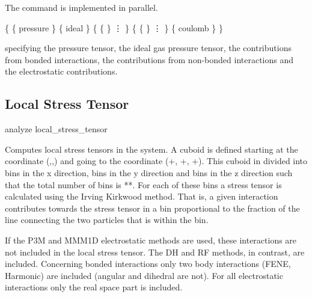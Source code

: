 The command is implemented in parallel.


\begin{code}
\{ \{ pressure  \}
   \{ ideal  \} 
   \{ \{   \}
      \vdots
   \}
   \{ \{   \}
      \vdots
   \}
   \{ coulomb  \}
\}
\end{code}
specifying the pressure tensor, the ideal gas pressure tensor, the
contributions from bonded interactions, the contributions from
non-bonded interactions and the electrostatic contributions.

\subsection{Local Stress Tensor}
\label{analyze:localstresstensor}

\begin{essyntax}
  analyze local_stress_tensor             
\end{essyntax}

Computes local stress tensors in the system.  A cuboid is defined starting at the coordinate
(,,) and going to the coordinate
(+, +,
+).  This cuboid in divided into  bins in the x
direction,  bins in the y direction and  bins in the z direction such that
the total number of bins is **.  For each of these bins a stress
tensor is calculated using the Irving Kirkwood method.  That is, a given interaction contributes
towards the stress tensor in a bin proportional to the fraction of the line connecting the two
particles that is within the bin.

If the P3M and MMM1D electrostatic methods are used, these
interactions are not included in the local stress tensor.  The DH and
RF methods, in contrast, are included. Concerning bonded interactions 
only two body interactions (FENE, Harmonic) are included (angular and dihedral are not).
For all electrostatic interactions only the real space part is included.

